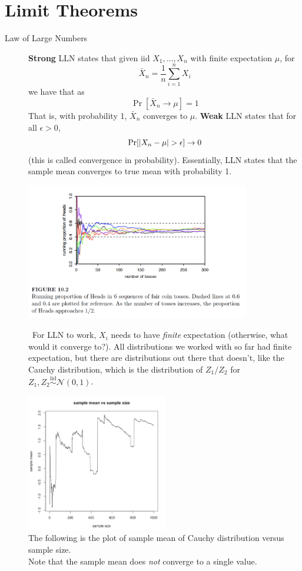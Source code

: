 \documentclass[11pt]{article}
\theoremstyle{definition}
\theoremstyle{remark}
\newcommand{\Norm}{\mathcal{N}}
\newcommand{\iidsim}{\overset{\text{iid}}{\sim}}
\begin{document}
\pagebreak

\section{Limit Theorems}

\begin{description}

    \item[Law of Large Numbers] \textbf{Strong} LLN states that given iid $X_1, \ldots, X_n$ with finite expectation $\mu$, for $$ \bar{X}_n = \frac{1}{n} \sum_{i=1}^n X_i $$ we have that as $$\Pr[ \bar{X}_n \to \mu ] = 1$$ That is, with probability 1, $\bar{X}_n$ converges to $\mu$. \textbf{Weak} LLN states that for all $\epsilon > 0$, $$\Pr[\abs{X_n - \mu} > \epsilon] \to 0$$ (this is called convergence in probability). Essentially, LLN states that the sample mean converges to true mean with probability 1. 
    
    \begin{center}
        \includegraphics[width=0.8\textwidth]{image/WLLN.png}
    \end{center}
    
    \Biohazard \ For LLN to work, $X_i$ needs to have \textit{finite} expectation (otherwise, what would it converge to?). All distributions we worked with so far had finite expectation, but there are distributions out there that doesn't, like the Cauchy distribution, which is the distribution of $Z_1 / Z_2$ for $Z_1, Z_2 \iidsim \Norm(0,1)$. 
    
    \begin{center}
        \includegraphics[width=0.5\textwidth]{image/cauchysample.png} \\
        The following is the plot of sample mean of Cauchy distribution versus sample size. \\
        Note that the sample mean does \textit{not} converge to a single value.
    \end{center}


\end{description}
\end{document}
